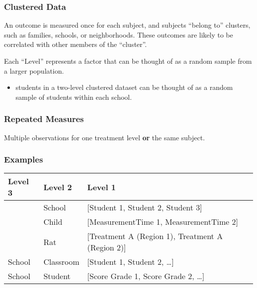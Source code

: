 \documentclass[11pt]{article}
\begin{document}
\subsubsection{Clustered Data}
\label{sec:org1c039cd}
An outcome is measured once for each subject, and subjects ``belong to'' clusters,
such as families, schools, or neighborhoods. These outcomes are likely to be
correlated with other members of the ``cluster''.

Each ``Level'' represents a factor that can be thought of as a random sample from
a larger population.
\begin{itemize}
\item students in a two-level clustered dataset can be thought of as a random sample
of students within each school.
\end{itemize}

\subsubsection{Repeated Measures}
\label{sec:orgbc167d7}
Multiple observations for one treatment level \textbf{or} the same subject.

\subsubsection{Examples}
\label{sec:orgcf6bfb0}

\begin{center}
\begin{tabular}{lll}
Level 3 & Level 2 & Level 1\\
\hline
 & School & [Student 1, Student 2, Student 3]\\
 & Child & [MeasurementTime 1, MeasurementTime 2]\\
 & Rat & [Treatment A (Region 1), Treatment A (Region 2)]\\
School & Classroom & [Student 1, Student 2, \ldots{}]\\
School & Student & [Score Grade 1, Score Grade 2, \ldots{}]\\
\end{tabular}
\end{center}
\end{document}
